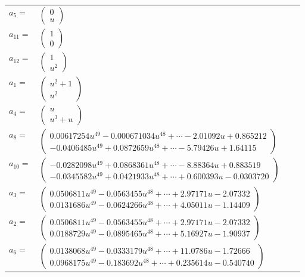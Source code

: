 \documentclass[1p]{elsarticle_modified}
\theoremstyle{definition}
\begin{document}
\begin{tabular}{m{7pt} m{180pt} m{7pt} m{180pt} }
\flushright $a_{5}=$&$\begin{pmatrix}0\\u\end{pmatrix}$ \\
\flushright $a_{11}=$&$\begin{pmatrix}1\\0\end{pmatrix}$ \\
\flushright $a_{12}=$&$\begin{pmatrix}1\\u^2\end{pmatrix}$ \\
\flushright $a_{1}=$&$\begin{pmatrix}u^2+1\\u^2\end{pmatrix}$ \\
\flushright $a_{4}=$&$\begin{pmatrix}u\\u^3+u\end{pmatrix}$ \\
\flushright $a_{8}=$&$\begin{pmatrix}0.00617254 u^{49}-0.000671034 u^{48}+\cdots-2.01092 u+0.865212\\-0.0406485 u^{49}+0.0872659 u^{48}+\cdots-5.79426 u+1.64115\end{pmatrix}$ \\
\flushright $a_{10}=$&$\begin{pmatrix}-0.0282098 u^{49}+0.0868361 u^{48}+\cdots-8.88364 u+0.883519\\-0.0345582 u^{49}+0.0421933 u^{48}+\cdots+0.600393 u-0.0303720\end{pmatrix}$ \\
\flushright $a_{3}=$&$\begin{pmatrix}0.0506811 u^{49}-0.0563455 u^{48}+\cdots+2.97171 u-2.07332\\0.0131686 u^{49}-0.0624266 u^{48}+\cdots+4.05011 u-1.14409\end{pmatrix}$ \\
\flushright $a_{2}=$&$\begin{pmatrix}0.0506811 u^{49}-0.0563455 u^{48}+\cdots+2.97171 u-2.07332\\0.0188729 u^{49}-0.0895465 u^{48}+\cdots+5.16927 u-1.90937\end{pmatrix}$ \\
\flushright $a_{6}=$&$\begin{pmatrix}0.0138068 u^{49}-0.0333179 u^{48}+\cdots+11.0786 u-1.72666\\0.0968175 u^{49}-0.183692 u^{48}+\cdots+0.235614 u-0.540740\end{pmatrix}$ \\

\end{tabular}
\end{document}
